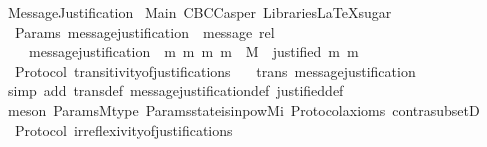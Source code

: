 %
\begin{isabellebody}%
%
%
\isadelimdocument
%
\endisadelimdocument
%
\isatagdocument
%
\isamarkuptrue%
%
\endisatagdocument
{\isafolddocument}%
%
\isadelimdocument
%
\endisadelimdocument
%
\isadelimtheory
%
\endisadelimtheory
%
\isatagtheory
{}\isamarkupfalse%
\ MessageJustification\isanewline
\isanewline
{}\ Main\ CBCCasper\ {\isachardoublequoteopen}Libraries{\isacharslash}LaTeXsugar{\isachardoublequoteclose}\isanewline
\isanewline
{}%
\endisatagtheory
{\isafoldtheory}%
%
\isadelimtheory
\isanewline
%
\endisadelimtheory
\isanewline
\isanewline
\isanewline
\isanewline
\isanewline
{}\isamarkupfalse%
\ {\isacharparenleft}\ Params{\isacharparenright}\ message{\isacharunderscore}justification\ {\isacharcolon}{\isacharcolon}\ {\isachardoublequoteopen}message\ rel{\isachardoublequoteclose}\isanewline
\ \ \ \isanewline
\ \ \ \ {\isachardoublequoteopen}message{\isacharunderscore}justification\ {\isacharequal}\ {\isacharbraceleft}{\isacharparenleft}m{}{\isacharcomma}\ m{}{\isacharparenright}{\isachardot}\ {\isacharbraceleft}m{}{\isacharcomma}\ m{}{\isacharbraceright}\ {\isasymsubseteq}\ M\ {\isasymand}\ justified\ m{}\ m{}{\isacharbraceright}{\isachardoublequoteclose}\ \isanewline
\isanewline
{}\isamarkupfalse%
\ {\isacharparenleft}\ Protocol{\isacharparenright}\ transitivity{\isacharunderscore}of{\isacharunderscore}justifications\ {\isacharcolon}\isanewline
\ \ {\isachardoublequoteopen}trans\ message{\isacharunderscore}justification{\isachardoublequoteclose}\isanewline
%
\isadelimproof
\ \ %
\endisadelimproof
%
\isatagproof
{}\isamarkupfalse%
\ {\isacharparenleft}simp\ add{\isacharcolon}\ trans{\isacharunderscore}def\ message{\isacharunderscore}justification{\isacharunderscore}def\ justified{\isacharunderscore}def{\isacharparenright}\isanewline
\ \ \isamarkupfalse%
\ {\isacharparenleft}meson\ Params{\isachardot}M{\isacharunderscore}type\ Params{\isachardot}state{\isacharunderscore}is{\isacharunderscore}in{\isacharunderscore}pow{\isacharunderscore}Mi\ Protocol{\isacharunderscore}axioms\ contra{\isacharunderscore}subsetD{\isacharparenright}%
\endisatagproof
{\isafoldproof}%
%
\isadelimproof
\isanewline
%
\endisadelimproof
\isanewline
{}\isamarkupfalse%
\ {\isacharparenleft}\ Protocol{\isacharparenright}\ irreflexivity{\isacharunderscore}of{\isacharunderscore}justifications\ {\isacharcolon}\isanewline

\end{isabellebody}
